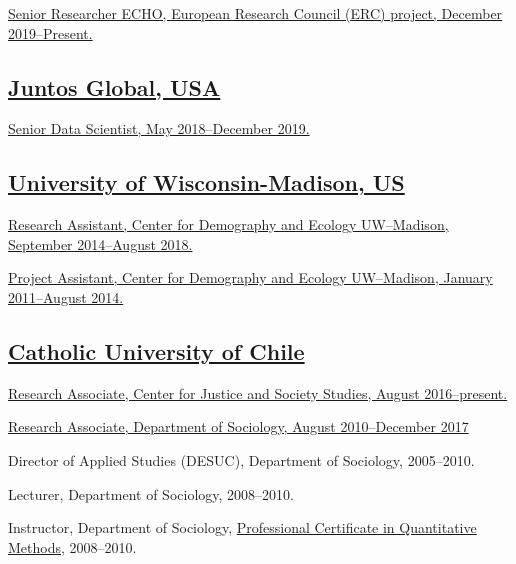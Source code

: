 \documentclass[10pt,letterpaper]{article}
\renewenvironment{itemize}{
  \begin{list}{}{
    \setlength{\leftmargin}{1.5em}
    \setlength{\itemsep}{0.25em}
    \setlength{\parskip}{0pt}
    \setlength{\parsep}{0.25em}
  }
}{
  \end{list}
}
\begin{document}
\begin{itemize}
\item \href{https://echo-erc.csic.es/}{Senior Researcher ECHO, European Research Council (ERC) project, December 2019--Present.}
\end{itemize}

\subsection*{\href{https://juntosglobal.com/}{Juntos Global, USA}}

\begin{itemize}
\item \href{https://juntosglobal.com/}{Senior Data Scientist, May 2018--December 2019.}
\end{itemize}

\subsection*{\href{http://sociologia.uc.cl/}{University of Wisconsin-Madison, US}}

\begin{itemize}
\item \href{http://www.ssc.wisc.edu/cde/people/grads.php}{Research Assistant, Center for Demography and Ecology UW--Madison, September 2014--August 2018.}
\item \href{http://www.ssc.wisc.edu/cde/people/grads.php}{Project Assistant, Center for Demography and Ecology UW--Madison, January 2011--August 2014.}
\end{itemize}

\subsection*{\href{http://sociologia.uc.cl/}{Catholic University of Chile}}
 \begin{itemize}
 \item \href{http://justiciaysociedad.uc.cl/nosotros/investigadores-asociados}{Research Associate, Center for Justice and Society Studies, August 2016--present.}
 \item \href{http://sociologia.uc.cl/desuc}{Research Associate, Department of Sociology, August 2010--December 2017}
 \item Director of Applied Studies (DESUC), Department of Sociology, 2005--2010.
 \item Lecturer, Department of Sociology, 2008--2010.
 \item Instructor, Department of Sociology, \href{http://www.educacioncontinua.uc.cl}{Professional Certificate in Quantitative Methods}, 2008--2010.
 \end{itemize}
\end{document}
